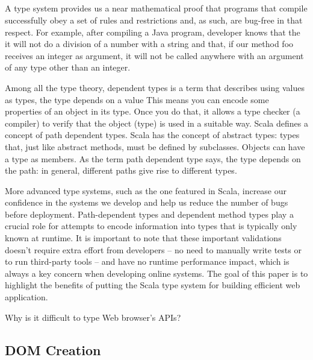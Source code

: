\documentclass[runningheads,a4paper]{llncs}
\begin{document}
\subsection{}

A type system provides us a near mathematical proof that programs that compile successfully obey a set of rules and restrictions and, as such, are bug-free in that respect. For example, after compiling a Java program, developer knows that the it will not do a division of a number with a string and that, if our method foo receives an integer as argument, it will not be called anywhere with an argument of any type other than an integer.

Among all the type theory,  dependent types is a term that describes using values as types,  the type depends on a value  This means you can encode some properties of an object in its type. Once you do that, it allows a type checker (a compiler) to verify that the object (type) is used in a suitable way. Scala defines a concept of path dependent types. Scala has the concept of abstract types: types that, just like abstract methods, must be defined by subclasses. Objects can have a type as members. As the term path dependent type says, the type depends on the path: in general, different paths give rise to different types. 
	

More advanced type systems, such as the one featured in Scala, increase our confidence in the systems we develop and help us reduce the number of bugs before deployment. Path-dependent types and dependent method types play a crucial role for attempts to encode information into types that is typically only known at runtime. It is important to note that these important validations doesn't require extra effort from developers – no need to manually write tests or to run third-party tools – and have no runtime performance impact, which is always a key concern when developing online systems. The goal of this paper is to highlight the benefits of putting the Scala type system for building efficient web application. 



Why is it difficult to type Web browser’s APIs?

\subsection{DOM Creation}
\end{document}
